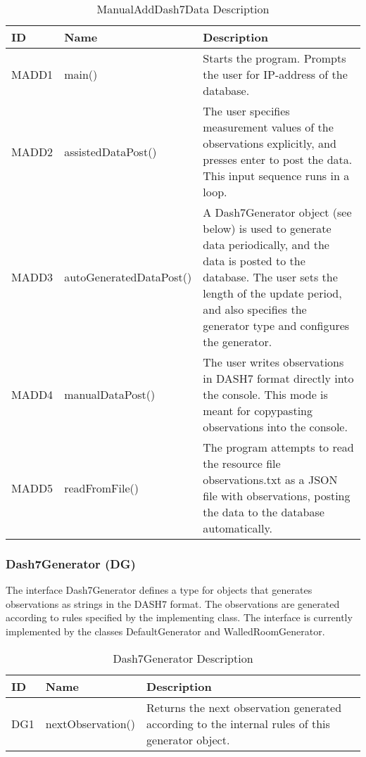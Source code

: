 \documentclass[../document]{subfiles}
\begin{document}
\begin{table}[H]
\caption{ManualAddDash7Data Description}
\centering
\begin{tabularx}{\textwidth}{|L{1.2cm}|L{4cm}|X|}
\hline 
ID
&Name
&Description
\\ \hline MADD1
&main()
&Starts the program. Prompts the user for IP-address of the database.
\\ \hline MADD2
&assistedDataPost()
&The user specifies measurement values of the observations explicitly, and presses enter to post the data. This input sequence runs in a loop.
\\ \hline MADD3
&autoGeneratedDataPost()
&A Dash7Generator object (see below) is used to generate data periodically, and the data is posted to the database. The user sets the length of the update period, and also specifies the generator type and configures the generator.
\\ \hline MADD4
&manualDataPost()
&The user writes observations in DASH7 format directly into the console. This mode is meant for copypasting observations into the console.
\\ \hline MADD5
&readFromFile()
&The program attempts to read the resource file observations.txt as a JSON file with observations, posting the data to the database automatically.

\\ \hline 
\end{tabularx}
\end{table}

\subsubsection{Dash7Generator (DG)}
The interface Dash7Generator defines a type for objects that generates observations as strings in the DASH7 format. The observations are generated according to rules specified by the implementing class. The interface is currently implemented by the classes DefaultGenerator and WalledRoomGenerator.

\begin{table}[H]
\caption{Dash7Generator Description}
\centering
\begin{tabularx}{\textwidth}{|L{1.2cm}|L{3.5cm}|X|}
\hline ID
&Name
&Description
\\ \hline 
DG1
&nextObservation()
&Returns the next observation generated according to the internal rules of this generator object.
\\ \hline 
\end{tabularx}
\end{table}
\end{document}
